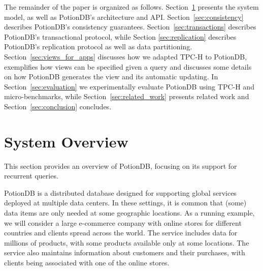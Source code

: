 \documentclass[sigconf, nonacm]{acmart}
\newcommand{\outline}[1]{}
\begin{document}
The remainder of the paper is organized as follows.
Section~\ref{sec:overview} presents the system model, as well as PotionDB's architecture and API.
Section~\ref{sec:consistency} describes PotionDB's consistency guarantees.
Section~\ref{sec:transactions} describes PotionDB's transactional protocol, while Section \ref{sec:replication} describes PotionDB's replication protocol as well as data partitioning.
Section~\ref{sec:views_for_apps} discusses how we adapted TPC-H to PotionDB, exemplifies how views can be specified given a query and discusses some details on how PotionDB generates the view and its automatic updating.
In Section~\ref{sec:evaluation} we experimentally evaluate PotionDB using TPC-H and micro-benchmarks, while Section~\ref{sec:related_work} presents related work and Section~\ref{sec:conclusion} concludes.


%


\section{System Overview}
\label{sec:overview}

This section provides an overview of PotionDB, focusing on its support for 
recurrent queries.

PotionDB is a distributed database designed for supporting global services deployed at multiple data centers. 
In these settings,
it is common that (some) data items are only needed at some geographic locations. 
As a running example, we will consider a large e-commerce company with online stores for different countries 
and clients spread across the world. 
The service includes data for millions of products, with some products available 
only at some locations. The service also maintains information about customers and their purchases, 
with clients being associated with one of the online stores.
\end{document}
